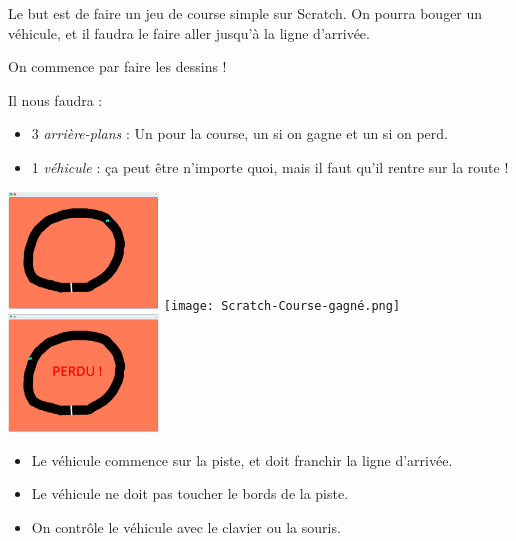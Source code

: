 \documentclass[a4paper,11pt]{article}
\theoremstyle{etape_style}
\begin{document}
\maketitle

Le but est de faire un jeu de course simple sur Scratch. On pourra bouger un véhicule, et il faudra le faire aller jusqu'à la ligne d'arrivée.

\begin{greybox}[frametitle={Dessins}]
	On commence par faire les dessins !

	Il nous faudra :
	\begin{itemize}
		\item 3 \textit{arrière-plans} : Un pour la course, un si on gagne et un si on perd.
		\item 1 \textit{véhicule} : ça peut être n'importe quoi, mais il faut qu'il rentre sur la route !
	\end{itemize}
\end{greybox}

\begin{center}
	\includegraphics[width=0.3\textwidth]{Scratch-Course.png}
	\texttt{[image: Scratch-Course-gagné.png]}
	\includegraphics[width=0.3\textwidth]{Scratch-Course-perdu.png}
\end{center}

\begin{greybox}[frametitle={Règles}]
	\begin{itemize}
		\item Le véhicule commence sur la piste, et doit franchir la ligne d'arrivée.
		\item Le véhicule ne doit pas toucher le bords de la piste.
		\item On contrôle le véhicule avec le clavier ou la souris.
	\end{itemize}
\end{greybox}
\end{document}
